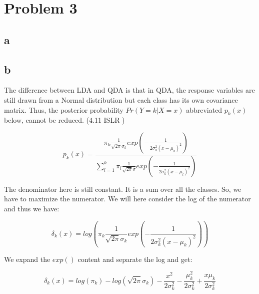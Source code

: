 \section*{Problem 3}
\subsection*{a}





\subsection*{b}
The difference between LDA and QDA is that in QDA, the response variables are still drawn from a Normal distribution but each class has its own covariance matrix. Thus, the posterior probability $ Pr(Y = k | X = x) $ abbreviated $ p_k(x) $ below, cannot be reduced. (4.11 ISLR )

\[ p_k (x) = \frac{\pi_k \frac{1}{\sqrt{2\pi}\sigma_k}exp({-\frac{1}{2\sigma^2_k (x - \mu_k)^2}})}{\sum_{l=1}^{k}\pi_l \frac{1}{\sqrt{2\pi}\sigma}exp({-\frac{1}{2\sigma^2_k (x - \mu_l)^2}})} \]

The denominator here is still constant. It is a sum over all the classes. So, we have to maximize the numerator. We will here consider the log of the numerator and thus we have:

\[ \delta_k (x) = log\left({\pi_k \frac{1}{\sqrt{2\pi}\sigma_k}exp\left({-\frac{1}{2\sigma^2_k (x - \mu_k)^2}}\right)}\right) \]

We expand the $exp()$ content and separate the log and get:

\[ \delta_k (x) = log(\pi_k) - log(\sqrt{2\pi}\sigma_k) - \frac{x^2}{2\sigma^2_k} - \frac{\mu^2_k}{2\sigma^2_k} + \frac{x\mu_k}{2\sigma^2_k} \]





